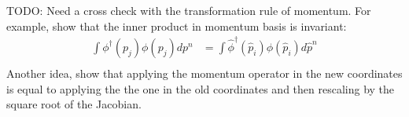 \documentclass[11pt]{article}
\begin{document}
TODO: Need a cross check with the transformation rule of momentum. For example, show that the inner product in momentum basis is invariant:
\begin{equation}
	\begin{aligned}
		\int \phi^\dagger(p_j) \phi(p_j) dp^n &= \int \hat{\phi}^\dagger(\hat{p}_i) \phi(\hat{p}_i) d\hat{p}^n  \\
	\end{aligned}
\end{equation}
Another idea, show that applying the momentum operator in the new coordinates is equal to applying the the one in the old coordinates and then rescaling by the square root of the Jacobian.
\end{document}

